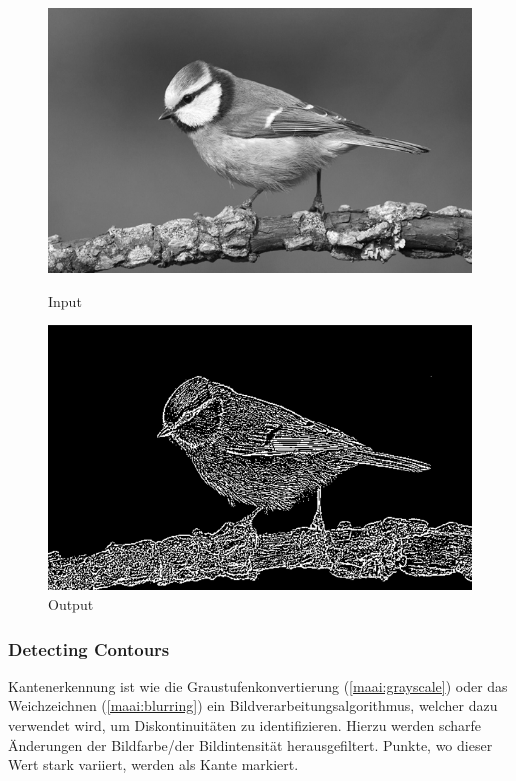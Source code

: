 \begin{figure}[htb]
  \centering
  \begin{minipage}[t]{0.45\linewidth}
    \centering
    \includegraphics[width=\linewidth]{pics/bildverarbeitungsalgos/grayscaling_output.png}
    \caption{Input}
    \label{maai:thresholding:input:thrid}
  \end{minipage}
  \hfill
  \begin{minipage}[t]{0.45\linewidth}
    \centering
    \includegraphics[width=\linewidth]{pics/bildverarbeitungsalgos/gaussian_thresholding.png}
    \caption{Output}
    \label{maai:gaussianthresholding:output}
  \end{minipage}
\end{figure}

\subsubsection{Detecting Contours}
Kantenerkennung ist wie die Graustufenkonvertierung (\ref{maai:grayscale}) oder das Weichzeichnen (\ref{maai:blurring}) ein Bildverarbeitungsalgorithmus, welcher dazu verwendet wird, um Diskontinuitäten zu identifizieren. Hierzu werden scharfe Änderungen der Bildfarbe/der Bildintensität herausgefiltert. Punkte, wo dieser Wert stark variiert, werden als Kante markiert.


